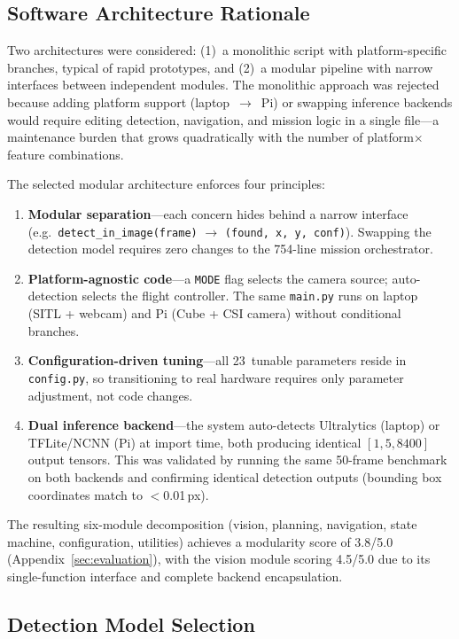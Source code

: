 \subsection{Software Architecture Rationale}\label{sec:arch-rationale}

Two architectures were considered: (1)~a monolithic script with platform-specific branches, typical of rapid prototypes, and (2)~a modular pipeline with narrow interfaces between independent modules. The monolithic approach was rejected because adding platform support (laptop~$\rightarrow$~Pi) or swapping inference backends would require editing detection, navigation, and mission logic in a single file---a maintenance burden that grows quadratically with the number of platform$\times$feature combinations.

\noindent The selected modular architecture enforces four principles:
\begin{enumerate}[nosep]
  \item \textbf{Modular separation}---each concern hides behind a narrow interface (e.g.\ \texttt{detect\_in\_image(frame)} $\to$ \texttt{(found, x, y, conf)}). Swapping the detection model requires zero changes to the 754-line mission orchestrator.
  \item \textbf{Platform-agnostic code}---a \texttt{MODE} flag selects the camera source; auto-detection selects the flight controller. The same \texttt{main.py} runs on laptop (SITL + webcam) and Pi (Cube + CSI camera) without conditional branches.
  \item \textbf{Configuration-driven tuning}---all 23~tunable parameters reside in \texttt{config.py}, so transitioning to real hardware requires only parameter adjustment, not code changes.
  \item \textbf{Dual inference backend}---the system auto-detects Ultralytics (laptop) or TFLite/NCNN (Pi) at import time, both producing identical $[1, 5, 8400]$ output tensors. This was validated by running the same 50-frame benchmark on both backends and confirming identical detection outputs (bounding box coordinates match to $<$0.01\,px).
\end{enumerate}

\noindent The resulting six-module decomposition (vision, planning, navigation, state machine, configuration, utilities) achieves a modularity score of 3.8/5.0 (Appendix~\ref{sec:evaluation}), with the vision module scoring 4.5/5.0 due to its single-function interface and complete backend encapsulation.

\subsection{Detection Model Selection}\label{sec:model-rationale}

